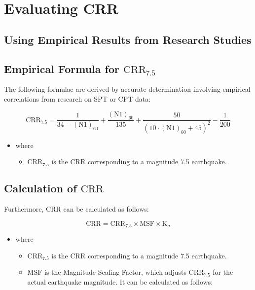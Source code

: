 \chapter{Evaluating CRR}

\section*{Using Empirical Results from Research Studies}

\section{Empirical Formula for \(\mathrm{CRR}_{7.5}\)}
The following formulae are derived by accurate determination involving empirical correlations from research on SPT or CPT data:

\begin{equation}
    \mathrm{CRR}_{7.5} = \frac{1}{34 - (\mathrm{N1})_{60}} + \frac{(\mathrm{N1})_{60}}{135} + \frac{50}{(10 \cdot (\mathrm{N1})_{60} + 45)^2} - \frac{1}{200}
\end{equation}

\begin{itemize}
    \item where
    \begin{itemize}
        \item \(\mathrm{CRR}_{7.5}\) is the \(\mathrm{CRR}\) corresponding to a magnitude 7.5 earthquake.
    \end{itemize}
\end{itemize}

\section{Calculation of \(\mathrm{CRR}\)}
Furthermore, \(\mathrm{CRR}\) can be calculated as follows:

\begin{equation}
    \mathrm{CRR} = \mathrm{CRR}_{7.5} \times \mathrm{MSF} \times \mathrm{K}_{\sigma}
\end{equation}

\begin{itemize}
    \item where
    \begin{itemize}
        \item \(\mathrm{CRR}_{7.5}\) is the \(\mathrm{CRR}\) corresponding to a magnitude 7.5 earthquake.
        \item \(\mathrm{MSF}\) is the Magnitude Scaling Factor, which adjusts \(\mathrm{CRR}_{7.5}\) for the actual earthquake magnitude. It can be calculated as follows:
    \end{itemize}
\end{itemize}

